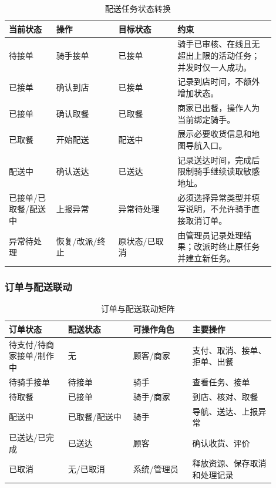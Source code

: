 \begin{longtable}{|L{0.16\linewidth}|L{0.21\linewidth}|L{0.20\linewidth}|L{0.33\linewidth}|}
\caption{配送任务状态转换}\label{tab:delivery-state}\\ \hline
\textbf{当前状态} & \textbf{操作} & \textbf{目标状态} & \textbf{约束} \\ \hline
待接单 & 骑手接单 & 已接单 & 骑手已审核、在线且无超出上限的活动任务；并发时仅一人成功。 \\ \hline
已接单 & 确认到店 & 已接单 & 记录到店时间，不额外增加状态。 \\ \hline
已接单 & 确认取餐 & 已取餐 & 商家已出餐，操作人为当前绑定骑手。 \\ \hline
已取餐 & 开始配送 & 配送中 & 展示必要收货信息和地图导航入口。 \\ \hline
配送中 & 确认送达 & 已送达 & 记录送达时间，完成后限制骑手继续读取敏感地址。 \\ \hline
已接单/已取餐/配送中 & 上报异常 & 异常待处理 & 必须选择异常类型并填写说明，不允许骑手直接取消订单。 \\ \hline
异常待处理 & 恢复/改派/终止 & 原状态/已取消 & 由管理员记录处理结果；改派时终止原任务并建立新任务。 \\ \hline
\end{longtable}

\subsubsection{订单与配送联动}

\begin{longtable}{|L{0.20\linewidth}|L{0.22\linewidth}|L{0.20\linewidth}|L{0.28\linewidth}|}
\caption{订单与配送联动矩阵}\label{tab:order-delivery-map}\\ \hline
\textbf{订单状态} & \textbf{配送状态} & \textbf{可操作角色} & \textbf{主要操作} \\ \hline
待支付/待商家接单/制作中 & 无 & 顾客/商家 & 支付、取消、接单、拒单、出餐 \\ \hline
待骑手接单 & 待接单 & 骑手 & 查看任务、接单 \\ \hline
待取餐 & 已接单 & 骑手/商家 & 到店、核对、取餐 \\ \hline
配送中 & 已取餐/配送中 & 骑手 & 导航、送达、上报异常 \\ \hline
已送达/已完成 & 已送达 & 顾客 & 确认收货、评价 \\ \hline
已取消 & 无/已取消 & 系统/管理员 & 释放资源、保存取消和处理记录 \\ \hline
\end{longtable}

